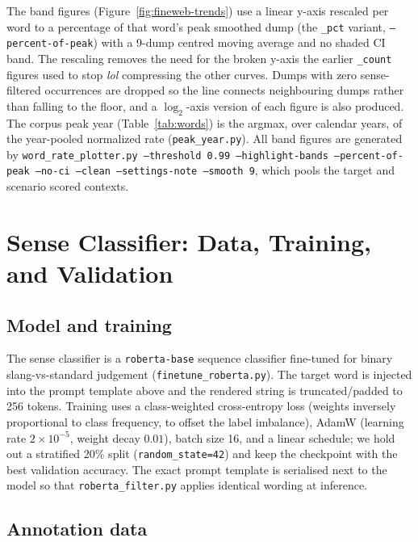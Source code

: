 \documentclass[11pt]{article}
\begin{document}
The band figures (Figure~\ref{fig:fineweb-trends}) use a linear y-axis rescaled per word to a percentage of that word's peak smoothed dump (the \texttt{\_pct} variant, \texttt{--percent-of-peak}) with a 9-dump centred moving average and no shaded CI band. The rescaling removes the need for the broken y-axis the earlier \texttt{\_count} figures used to stop \textit{lol} compressing the other curves. Dumps with zero sense-filtered occurrences are dropped so the line connects neighbouring dumps rather than falling to the floor, and a $\log_2$-axis version of each figure is also produced. The corpus peak year (Table~\ref{tab:words}) is the argmax, over calendar years, of the year-pooled normalized rate (\texttt{peak\_year.py}). All band figures are generated by \texttt{word\_rate\_plotter.py --threshold 0.99 --highlight-bands --percent-of-peak --no-ci --clean --settings-note --smooth 9}, which pools the target and scenario scored contexts.

\section{Sense Classifier: Data, Training, and Validation}%
\label{app:classifier}

\subsection{Model and training}

The sense classifier is a \texttt{roberta-base} sequence classifier fine-tuned for binary slang-vs-standard judgement (\texttt{finetune\_roberta.py}). The target word is injected into the prompt template above and the rendered string is truncated/padded to 256 tokens. Training uses a class-weighted cross-entropy loss (weights inversely proportional to class frequency, to offset the label imbalance), AdamW (learning rate $2\times10^{-5}$, weight decay $0.01$), batch size 16, and a linear schedule; we hold out a stratified 20\% split (\texttt{random\_state=42}) and keep the checkpoint with the best validation accuracy. The exact prompt template is serialised next to the model so that \texttt{roberta\_filter.py} applies identical wording at inference.

\subsection{Annotation data}
\end{document}
